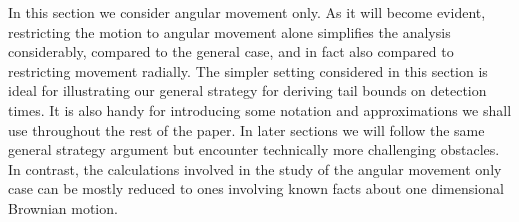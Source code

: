 In this section we consider angular movement only.
As it will become evident, restricting the motion to angular
movement alone simplifies the analysis considerably, 
compared to the general case, and in fact also compared
to restricting movement radially.
The simpler setting considered in this section is ideal for
illustrating our general strategy for
deriving tail bounds on detection times.
It is also handy for introducing some notation and approximations we shall 
use throughout the rest of the paper.
In later sections we will follow the same general strategy
argument but encounter technically more challenging obstacles.
In contrast, the calculations involved in the study of
the angular movement only case can be mostly reduced to
ones involving known facts about one dimensional Brownian motion.


\begin{figure}
  \begin{center}
\end{center}
\end{figure}
